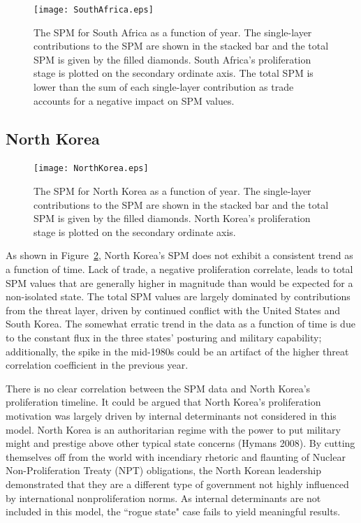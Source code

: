 \documentclass{article} %
\begin{document}
{\begin{figure}
  \centering
  \texttt{[image: SouthAfrica.eps]}
  \caption{The SPM for South Africa as a function of year. The single-layer contributions to the SPM are shown in the stacked bar and the total SPM is given by the filled diamonds. South Africa's proliferation stage is plotted on the secondary ordinate axis. The total SPM is lower than the sum of each single-layer contribution as trade accounts for a negative impact on SPM values.}
  \label{fig:southafrica}
\end{figure}

\subsection*{North Korea}

\begin{figure}
  \centering
  \texttt{[image: NorthKorea.eps]}
  \caption{The SPM for North Korea as a function of year. The single-layer contributions to the SPM are shown in the stacked bar and the total SPM is given by the filled diamonds. North Korea's proliferation stage is plotted on the secondary ordinate axis.}
  \label{fig:nk}
\end{figure}

As shown in Figure~\ref{fig:nk}, North Korea's SPM does not exhibit a consistent trend as a function of time. Lack of trade, a negative proliferation correlate, leads to total SPM values that are generally higher in magnitude than would be expected for a non-isolated state. The total SPM values are largely dominated by contributions from the threat layer, driven by continued conflict with the United States and South Korea. The somewhat erratic trend in the data as a function of time is due to the constant flux in the three states' posturing and military capability; additionally, the spike in the mid-1980s could be an artifact of the higher threat correlation coefficient in the previous year.

There is no clear correlation between the SPM data and North Korea's proliferation timeline. It could be argued that North Korea's proliferation motivation was largely driven by internal determinants not considered in this model. North Korea is an authoritarian regime with the power to put military might and prestige above other typical state concerns (Hymans 2008). By cutting themselves off from the world with incendiary rhetoric and flaunting of Nuclear Non-Proliferation Treaty (NPT) obligations, the North Korean leadership demonstrated that they are a different type of government not highly influenced by international nonproliferation norms. As internal determinants are not included in this model, the ``rogue state" case fails to yield meaningful results.


}
\end{document}

